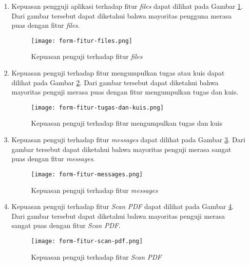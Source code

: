 \begin{enumerate}
\item Kepuasan pengguji aplikasi terhadap fitur \textit{files} dapat dilihat pada Gambar \ref{responses:feature:files}. Dari gambar tersebut dapat diketahui bahwa mayoritas pengguna merasa puas dengan fitur \textit{files}. 
\begin{figure}[H] 
	\centering  
	\texttt{[image: form-fitur-files.png]}  
	\caption[Kepuasan penguji terhadap fitur \textit{files}] {Kepuasan penguji terhadap fitur \textit{files}} 
	\label{responses:feature:files} 
\end{figure}

\item Kepuasan penguji terhadap fitur mengumpulkan tugas atau kuis dapat dilihat pada Gambar \ref{responses:feature:submission}. Dari gambar tersebut dapat diketahui bahwa mayoritas penguji merasa puas dengan fitur mengumpulkan tugas dan kuis.
\begin{figure}[H] 
	\centering  
	\texttt{[image: form-fitur-tugas-dan-kuis.png]}  
	\caption[Kepuasan penguji terhadap fitur mengumpulkan tugas dan kuis] {Kepuasan penguji terhadap fitur mengumpulkan tugas dan kuis} 
	\label{responses:feature:submission} 
\end{figure}

\item Kepuasan penguji terhadap fitur \textit{messages} dapat dilihat pada Gambar \ref{responses:feature:messages}. Dari gambar tersebut dapat diketahui bahwa mayoritas penguji merasa sangat puas dengan fitur \textit{messages}.
\begin{figure}[H] 
	\centering  
	\texttt{[image: form-fitur-messages.png]}  
	\caption[Kepuasan penguji terhadap fitur \textit{messages}] {Kepuasan penguji terhadap fitur \textit{messages}} 
	\label{responses:feature:messages} 
\end{figure}

\item Kepuasan penguji terhadap fitur \textit{Scan PDF} dapat dilihat pada Gambar \ref{responses:feature:scanPDF}. Dari gambar tersebut dapat diketahui bahwa mayoritas penguji merasa sangat puas dengan fitur \textit{Scan PDF}.
\begin{figure}[H] 
	\centering  
	\texttt{[image: form-fitur-scan-pdf.png]}  
	\caption[Kepuasan penguji terhadap fitur \textit{Scan PDF}] {Kepuasan penguji terhadap fitur \textit{Scan PDF}} 
	\label{responses:feature:scanPDF} 
\end{figure}


\end{enumerate}
